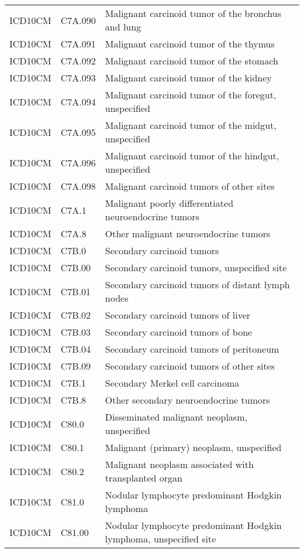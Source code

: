 \begin{longtable}{p{}p{}p{}}
  ICD10CM & C7A.090 & Malignant carcinoid tumor of the bronchus and lung \\ 
  ICD10CM & C7A.091 & Malignant carcinoid tumor of the thymus \\ 
  ICD10CM & C7A.092 & Malignant carcinoid tumor of the stomach \\ 
  ICD10CM & C7A.093 & Malignant carcinoid tumor of the kidney \\ 
  ICD10CM & C7A.094 & Malignant carcinoid tumor of the foregut, unspecified \\ 
  ICD10CM & C7A.095 & Malignant carcinoid tumor of the midgut, unspecified \\ 
  ICD10CM & C7A.096 & Malignant carcinoid tumor of the hindgut, unspecified \\ 
  ICD10CM & C7A.098 & Malignant carcinoid tumors of other sites \\ 
  ICD10CM & C7A.1 & Malignant poorly differentiated neuroendocrine tumors \\ 
  ICD10CM & C7A.8 & Other malignant neuroendocrine tumors \\ 
  ICD10CM & C7B.0 & Secondary carcinoid tumors \\ 
  ICD10CM & C7B.00 & Secondary carcinoid tumors, unspecified site \\ 
  ICD10CM & C7B.01 & Secondary carcinoid tumors of distant lymph nodes \\ 
  ICD10CM & C7B.02 & Secondary carcinoid tumors of liver \\ 
  ICD10CM & C7B.03 & Secondary carcinoid tumors of bone \\ 
  ICD10CM & C7B.04 & Secondary carcinoid tumors of peritoneum \\ 
  ICD10CM & C7B.09 & Secondary carcinoid tumors of other sites \\ 
  ICD10CM & C7B.1 & Secondary Merkel cell carcinoma \\ 
  ICD10CM & C7B.8 & Other secondary neuroendocrine tumors \\ 
  ICD10CM & C80.0 & Disseminated malignant neoplasm, unspecified \\ 
  ICD10CM & C80.1 & Malignant (primary) neoplasm, unspecified \\ 
  ICD10CM & C80.2 & Malignant neoplasm associated with transplanted organ \\ 
  ICD10CM & C81.0 & Nodular lymphocyte predominant Hodgkin lymphoma \\ 
  ICD10CM & C81.00 & Nodular lymphocyte predominant Hodgkin lymphoma, unspecified site \\ 

\end{longtable}
